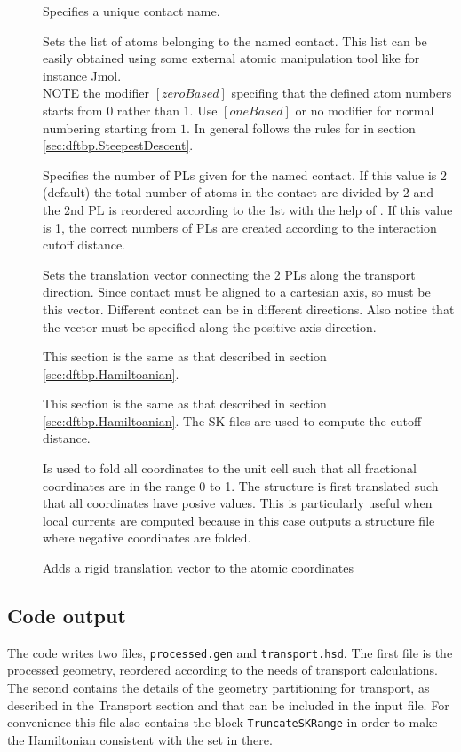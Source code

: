 \begin{description}
\item[] Specifies a unique contact name.
\item[] Sets the list of atoms belonging to the named contact. This list can
	be easily obtained using some external atomic manipulation tool like for instance Jmol. \\ 
	NOTE the modifier $[zeroBased]$ specifing that the defined atom numbers starts from $0$
	rather than $1$. Use $[oneBased]$ or no modifier for normal numbering starting from $1$.
	In general follows the rules for  in section \ref{sec:dftbp.SteepestDescent}.
\item[] Specifies the number of PLs given for the named contact. If this value 
	is 2 (default) the total number of atoms in the contact are divided by 2 and the 2nd PL
	is reordered according to the 1st with the help of . 
	If this value is 1, the correct numbers of PLs are created according to the interaction cutoff
	distance. 
\item[] Sets the translation vector connecting the 2 PLs along the transport direction. 
	Since contact must be aligned to a cartesian axis, so must be this vector. Different contact
      can be in different directions. Also notice that the vector must be specified along the positive axis 
      direction.
\item[]  This section is the same as that described in section \ref{sec:dftbp.Hamiltoanian}.
\item[]  This section is the same as that described in section 
	\ref{sec:dftbp.Hamiltoanian}. The SK files are used to compute the cutoff distance.
\item[] Is used to fold all coordinates to the unit cell such that all fractional
	coordinates are in the range 0 to 1. The structure is first translated such that all coordinates
	have posive values. This is particularly useful when local currents are computed 
	because in this case \dftbp{} outputs a structure file where negative coordinates are folded.
\item[] Adds a rigid translation vector to the atomic coordinates  

\end{description}

\subsection{Code output}

The code writes two files, \verb|processed.gen| and \verb|transport.hsd|. The first file is the 
processed geometry, reordered according to the needs of transport calculations. The second 
contains the details of the geometry partitioning for transport, as described in the Transport 
section and that can be included in the input file.
For convenience this file also contains the block \verb|TruncateSKRange| in order to 
make the Hamiltonian consistent with the  set in there. 


